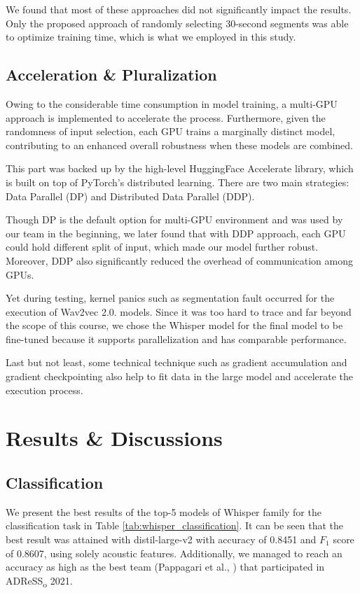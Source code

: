 \documentclass[journal]{IEEEtran}
\begin{document}
We found that most of these approaches did not significantly impact the results. Only the proposed approach of randomly selecting 30-second segments was able to optimize training time, which is what we employed in this study.

\subsection{Acceleration \& Pluralization}

Owing to the considerable time consumption in model training, a multi-GPU approach is implemented to accelerate the process. Furthermore, given the randomness of input selection, each GPU trains a marginally distinct model, contributing to an enhanced overall robustness when these models are combined.

This part was backed up by the high-level HuggingFace Accelerate library\cite{accelerate}, which is built on top of PyTorch's distributed learning. There are two main strategies: Data Parallel (DP) and Distributed Data Parallel (DDP).

Though DP is the default option for multi-GPU environment and was used by our team in the beginning, we later found that with DDP approach, each GPU could hold different split of input, which made our model further robust. Moreover, DDP also significantly reduced the overhead of communication among GPUs.

Yet during testing, kernel panics such as segmentation fault occurred for the execution of Wav2vec 2.0. models. Since it was too hard to trace and far beyond the scope of this course, we chose the Whisper model for the final model to be fine-tuned because it supports parallelization and has comparable performance.

Last but not least, some technical technique such as gradient accumulation and gradient checkpointing also help to fit data in the large model and accelerate the execution process.


\section{Results \& Discussions}

\subsection{Classification}

We present the best results of the top-5 models of Whisper family for the classification task in Table \ref{tab:whisper_classification}. It can be seen that the best result was attained with distil-large-v2 with accuracy of 0.8451 and $F_1$ score of 0.8607, using solely acoustic features. Additionally, we managed to reach an accuracy as high as the best team (Pappagari et al., \cite{pappagari21_interspeech}) that participated in ADReSS\textsubscript{o} 2021. 
\end{document}
